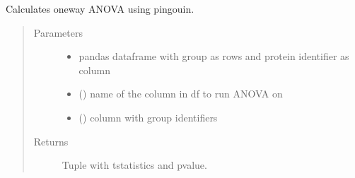 \documentclass[letterpaper,10pt,english]{sphinxmanual}
\begin{document}
\begin{fulllineitems}
\label{\detokenize{_autosummary/analytics_core.analytics:analytics_core.analytics.analytics.calculate_anova}}
Calculates one\sphinxhyphen{}way ANOVA using pingouin.
\begin{quote}\begin{description}
\item[{Parameters}] \leavevmode\begin{itemize}
\item {} 
 \textendash{} pandas dataframe with group as rows and protein identifier as column

\item {} 
 () \textendash{} name of the column in df to run ANOVA on

\item {} 
 () \textendash{} column with group identifiers

\end{itemize}

\item[{Returns}] \leavevmode
Tuple with t\sphinxhyphen{}statistics and p\sphinxhyphen{}value.

\end{description}\end{quote}

\end{fulllineitems}

\end{document}

